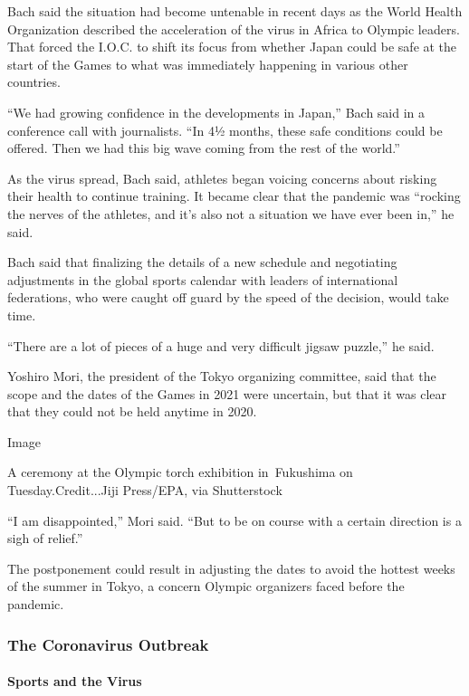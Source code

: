 Bach said the situation had become untenable in recent days as the World
Health Organization described the acceleration of the virus in Africa to
Olympic leaders. That forced the I.O.C. to shift its focus from whether
Japan could be safe at the start of the Games to what was immediately
happening in various other countries.

``We had growing confidence in the developments in Japan,'' Bach said in
a conference call with journalists. ``In 4½ months, these safe
conditions could be offered. Then we had this big wave coming from the
rest of the world.''

As the virus spread, Bach said, athletes began voicing concerns about
risking their health to continue training. It became clear that the
pandemic was ``rocking the nerves of the athletes, and it's also not a
situation we have ever been in,'' he said.

Bach said that finalizing the details of a new schedule and negotiating
adjustments in the global sports calendar with leaders of international
federations, who were caught off guard by the speed of the decision,
would take time.

``There are a lot of pieces of a huge and very difficult jigsaw
puzzle,'' he said.

Yoshiro Mori, the president of the Tokyo organizing committee, said that
the scope and the dates of the Games in 2021 were uncertain, but that it
was clear that they could not be held anytime in 2020.

Image

A ceremony at the Olympic torch exhibition in~Fukushima on
Tuesday.Credit...Jiji Press/EPA, via Shutterstock

``I am disappointed,'' Mori said. ``But to be on course with a certain
direction is a sigh of relief.''

The postponement could result in adjusting the dates to avoid the
hottest weeks of the summer in Tokyo, a concern Olympic organizers faced
before the pandemic.

\hypertarget{the-coronavirus-outbreak}{%
\subsubsection{The Coronavirus
Outbreak}\label{the-coronavirus-outbreak}}

\hypertarget{sports-and-the-virus}{%
\paragraph{Sports and the Virus}\label{sports-and-the-virus}}

